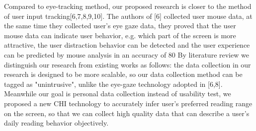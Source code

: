 \documentclass{sigchi}
\begin{document}
Compared to eye-tracking method, our proposed research is closer to the method of user input tracking[6,7,8,9,10].  The authors of [6] collected user mouse data, at the same time they collected user’s eye gaze data, they proved that the user mouse data can indicate user behavior, e.g. which part of the screen is more attractive, the user distraction behavior can be detected and the user experience can be predicted by mouse analysis in an accuracy of 80%
By literature review we distinguish our research from existing works as follows: the data collection in our research is designed to be more scalable, so our data collection method can be tagged as "unintrusive", unlike the eye-gaze technology adopted in [6,8]. Meanwhile our goal is personal data collection instead of usability test, we proposed a new CHI technology to accurately infer user’s preferred reading range on the screen, so that we can collect high quality data that can describe a user’s daily reading behavior objectively. 
\end{document}
